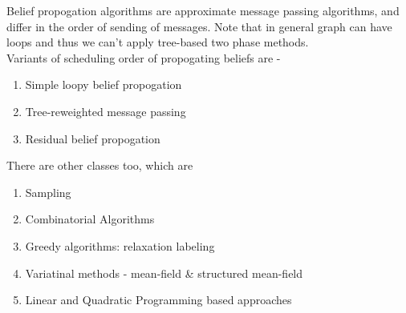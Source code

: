 Belief propogation algorithms are approximate message passing algorithms, and differ in the order of sending of messages. Note that in general graph can have loops and thus we can't apply tree-based two phase methods. \\
\noindent Variants of scheduling order of propogating beliefs are - 
\begin{enumerate}
	\item Simple loopy belief propogation
	\item Tree-reweighted message passing
	\item Residual belief propogation
\end{enumerate}
There are other classes too, which are
\begin{enumerate}
	\item Sampling
	\item Combinatorial Algorithms
	\item Greedy algorithms: relaxation labeling
	\item Variatinal methods - mean-field \& structured mean-field
	\item Linear and Quadratic Programming based approaches
\end{enumerate}